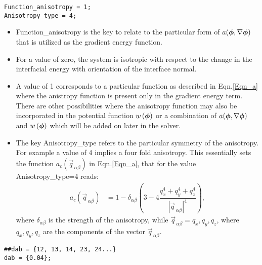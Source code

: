 \documentclass[a4paper,10pt]{article}
\newcommand{\vphi}{\mbox{\boldmath{$\phi$}}}
\begin{document}
\begin{lstlisting}
Function_anisotropy = 1;
Anisotropy_type = 4; 
\end{lstlisting}

\begin{itemize}
 \item Function\_anisotropy is the key to relate to the particular form of $a(\vphi, \nabla \vphi)$ that is utilized as the gradient energy function.
 \item For a value of zero, the system is isotropic with respect to the change in the interfacial energy with orientation of the interface normal.
 \item A value of 1 corresponds to a particular function as described in Eqn.\ref{Eqn_a} where the anistropy function is present only in the gradient 
 energy term. There are other possibilities where the anisotropy function may also be incorporated in the potential function $w\left(\vphi\right)$ or a combination of 
 $a(\vphi, \nabla \vphi)$ and $w\left(\vphi\right)$ which will be added on later in the solver.
 \item The key Anisotropy\_type refers to the particular symmetry of the anisotropy. For example a value of 4 implies a four fold anisotropy. This essentially sets the 
 function $a_c\left(\vec{q}_{\,\alpha\beta}\right)$ in Eqn.\ref{Eqn_a}, that for the value Anisotropy\_type=4 reads:
 \begin{align*}
  a_c\left(\vec{q}_{\,\alpha\beta}\right) &= 1-\delta_{\alpha\beta}\left(3-4\dfrac{q_x^{4} + q_y^{4} + q_z^{4}}{\left|\vec{q}_{\,\alpha\beta}\right|^{4}}\right), 
 \end{align*}
  where $\delta_{\alpha\beta}$ is the strength of the anisotropy, while $\vec{q}_{\,\alpha\beta}={q_x,q_y,q_z}$, where $q_{x},q_{y},q_{z}$ are the components 
  of the vector $\vec{q}_{\,\alpha\beta}$.
\end{itemize}

\begin{lstlisting}
##dab = {12, 13, 14, 23, 24...}
dab = {0.04};
\end{lstlisting}
\end{document}

